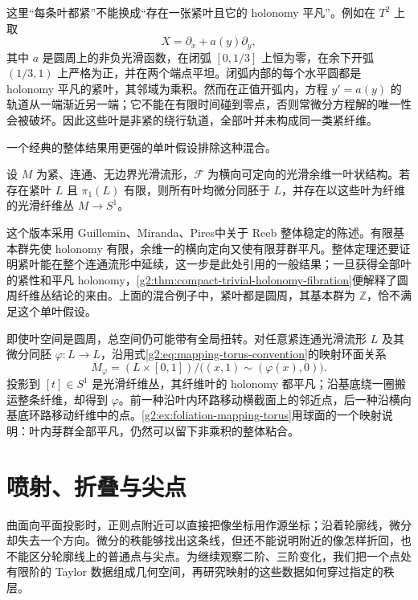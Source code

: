 这里“每条叶都紧”不能换成“存在一张紧叶且它的 holonomy 平凡”。例如在 \(T^2\) 上取
\[
	X=\partial_x+a(y)\partial_y,
\]
其中 \(a\) 是圆周上的非负光滑函数，在闭弧 \([0,1/3]\) 上恒为零，在余下开弧 \((1/3,1)\) 上严格为正，并在两个端点平坦。闭弧内部的每个水平圆都是 holonomy 平凡的紧叶，其邻域为乘积。然而在正值开弧内，方程 \(y'=a(y)\) 的轨道从一端渐近另一端；它不能在有限时间碰到零点，否则常微分方程解的唯一性会被破坏。因此这些叶是非紧的绕行轨道，全部叶并未构成同一类紧纤维。

\ProseParagraphBreak

一个经典的整体结果用更强的单叶假设排除这种混合。

\begin{theorem}\label{g2:thm:global-reeb-stability}
	设 \(M\) 为紧、连通、无边界光滑流形，\(\mathcal F\) 为横向可定向的光滑余维一叶状结构。若存在紧叶 \(L\) 且 \(\pi_1(L)\) 有限，则所有叶均微分同胚于 \(L\)，并存在以这些叶为纤维的光滑纤维丛 \(M\to S^1\)。
\end{theorem}

这个版本采用 Guillemin、Miranda、Pires\cite{GuilleminMirandaPires2011Foliations}中关于 Reeb 整体稳定的陈述。有限基本群先使 holonomy 有限，余维一的横向定向又使有限芽群平凡。整体定理还要证明紧叶能在整个连通流形中延续，这一步是此处引用的一般结果；一旦获得全部叶的紧性和平凡 holonomy，\cref{g2:thm:compact-trivial-holonomy-fibration}便解释了圆周纤维丛结论的来由。上面的混合例子中，紧叶都是圆周，其基本群为 \(\mathbb Z\)，恰不满足这个单叶假设。

\ProseParagraphBreak

即使叶空间是圆周，总空间仍可能带有全局扭转。对任意紧连通光滑流形 \(L\) 及其微分同胚 \(\varphi:L\to L\)，沿用式\eqref{g2:eq:mapping-torus-convention}的映射环面关系
\[
	M_\varphi=(L\times[0,1])/\bigl((x,1)\sim(\varphi(x),0)\bigr).
\]
投影到 \([t]\in S^1\) 是光滑纤维丛，其纤维叶的 holonomy 都平凡；沿基底绕一圈搬运整条纤维，却得到 \(\varphi\)。前一种沿叶内环路移动横截面上的邻近点，后一种沿横向基底环路移动纤维中的点。\cref{g2:ex:foliation-mapping-torus}用球面的一个映射说明：叶内芽群全部平凡，仍然可以留下非乘积的整体粘合。

\section{喷射、折叠与尖点}
\label{g2:sec:D03}

曲面向平面投影时，正则点附近可以直接把像坐标用作源坐标；沿着轮廓线，微分却失去一个方向。微分的秩能够找出这条线，但还不能说明附近的像怎样折回，也不能区分轮廓线上的普通点与尖点。为继续观察二阶、三阶变化，我们把一个点处有限阶的 Taylor 数据组成几何空间，再研究映射的这些数据如何穿过指定的秩层。

